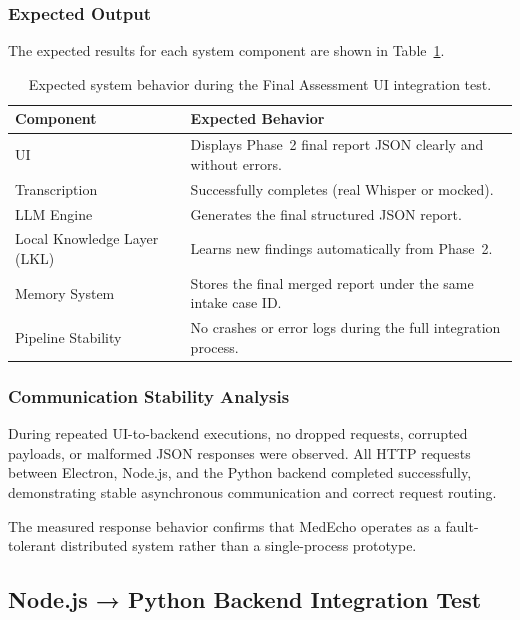 \subsubsection*{Expected Output}
The expected results for each system component are shown in Table~\ref{tab:final-assessment-ui-expectations}.

\begin{table}[H]
\centering
\renewcommand{\arraystretch}{1.3}
\begin{tabular}{|p{3cm}|p{10cm}|}
\hline
\textbf{Component} & \textbf{Expected Behavior} \\
\hline
UI & Displays Phase~2 final report JSON clearly and without errors. \\
\hline
Transcription & Successfully completes (real Whisper or mocked). \\
\hline
LLM Engine & Generates the final structured JSON report. \\
\hline
Local Knowledge Layer (LKL) & Learns new findings automatically from Phase~2. \\
\hline
Memory System & Stores the final merged report under the same intake case ID. \\
\hline
Pipeline Stability & No crashes or error logs during the full integration process. \\
\hline
\end{tabular}
\caption{Expected system behavior during the Final Assessment UI integration test.}
\label{tab:final-assessment-ui-expectations}
\end{table}
\subsubsection*{Communication Stability Analysis}

During repeated UI-to-backend executions, no dropped requests, corrupted payloads, or malformed JSON responses were observed. All HTTP requests between Electron, Node.js, and the Python backend completed successfully, demonstrating stable asynchronous communication and correct request routing.

The measured response behavior confirms that MedEcho operates as a fault-tolerant distributed system rather than a single-process prototype.




\subsection{Node.js → Python Backend Integration Test}
\label{sec:testing:node-python}

